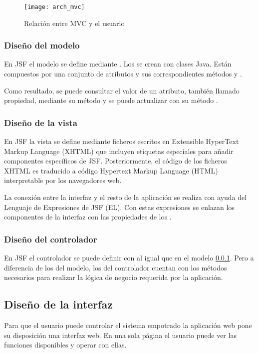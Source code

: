 \begin{figure}[H]
  \centering
  \texttt{[image: arch\_mvc]}
  \caption{Relación entre MVC y el usuario} \label{fig:mvc}
\end{figure}

\subsubsection{Diseño del modelo} \label{sec:arch-modelo}
En JSF el modelo se define mediante . Los
 se crean con clases Java. Están compuestos por una
conjunto de atributos y sus correspondientes métodos 
 y .

Como resultado, se puede consultar el valor de un atributo, también llamado
propiedad, mediante su método  y se puede actualizar con su
método .

\subsubsection{Diseño de la vista} \label{sec:arch-vista}
En JSF la vista se define mediante ficheros escritos en Extensible HyperText
Markup Language (XHTML) que incluyen etiquetas especiales para añadir
componentes específicos de JSF. Posteriormente, el código de los ficheros XHTML
es traducido a código Hypertext Markup Language (HTML) interpretable por los
navegadores web.

La conexión entre la interfaz y el resto de la aplicación se realiza con ayuda
del Lenguaje de Expresiones de JSF (EL). Con estas expresiones se enlazan los
componentes de la interfaz con las propiedades de los .

\subsubsection{Diseño del controlador} \label{sec:arch-ctl}
En JSF el controlador se puede definir con  al igual
que en el modelo \ref{sec:arch-modelo}. Pero a diferencia de los
 del modelo, los  del controlador
cuentan con los métodos necesarios para realizar la lógica de negocio
requerida por la aplicación.

\subsection{Diseño de la interfaz} \label{sec:design-iface}
Para que el usuario puede controlar el sistema empotrado la aplicación web
pone su disposición una interfaz web. En una sola página el usuario puede
ver las funciones disponibles y operar con ellas.

